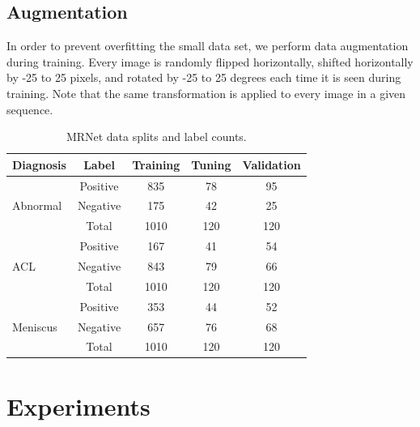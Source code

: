 \documentclass[10pt,twocolumn,letterpaper]{article}
\begin{document}
\subsection{Augmentation}

In order to prevent overfitting the small data set, we perform data augmentation during training. Every image is randomly flipped horizontally, shifted horizontally by -25 to 25 pixels, and rotated by -25 to 25 degrees each time it is seen during training. Note that the same transformation is applied to every image in a given sequence.

\begin{table}
\begin{center}
\begin{tabular}{|lc|c|c|c|}
\hline
Diagnosis & Label & Training & Tuning & Validation \\
\hline
\multirow{ 3}{*}{Abnormal} & Positive & 835 & 78 & 95 \\
                           & Negative & 175 & 42 & 25 \\
                           & Total & 1010 & 120 & 120 \\
\hline
\multirow{ 3}{*}{ACL}      & Positive & 167 & 41 & 54 \\
                           & Negative & 843 & 79 & 66 \\
                           & Total & 1010 & 120 & 120 \\
\hline
\multirow{ 3}{*}{Meniscus} & Positive & 353 & 44 & 52 \\
                           & Negative & 657 & 76 & 68 \\
                           & Total & 1010 & 120 & 120 \\
\hline
\end{tabular}
\end{center}
\caption{MRNet data splits and label counts.}
\label{tab:dataset}
\end{table}

\section{Experiments} %
\end{document}
